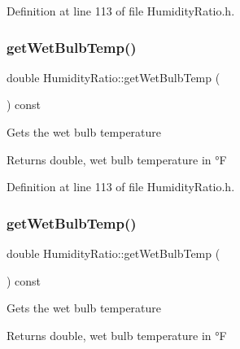 Definition at line 113 of file Humidity\+Ratio.\+h.

\mbox{\label{class_humidity_ratio_adbadf93878e4867ce283319859d04087}} 
\subsubsection{\texorpdfstring{get\+Wet\+Bulb\+Temp()}{getWetBulbTemp()}\hspace{0.1cm}{\footnotesize\ttfamily [2/3]}}
{\footnotesize\ttfamily double Humidity\+Ratio\+::get\+Wet\+Bulb\+Temp (\begin{DoxyParamCaption}{ }\end{DoxyParamCaption}) const\hspace{0.3cm}{\ttfamily [inline]}}

Gets the wet bulb temperature

\begin{DoxyReturn}{Returns}
double, wet bulb temperature in °F 
\end{DoxyReturn}


Definition at line 113 of file Humidity\+Ratio.\+h.

\mbox{\label{class_humidity_ratio_adbadf93878e4867ce283319859d04087}} 
\subsubsection{\texorpdfstring{get\+Wet\+Bulb\+Temp()}{getWetBulbTemp()}\hspace{0.1cm}{\footnotesize\ttfamily [3/3]}}
{\footnotesize\ttfamily double Humidity\+Ratio\+::get\+Wet\+Bulb\+Temp (\begin{DoxyParamCaption}{ }\end{DoxyParamCaption}) const\hspace{0.3cm}{\ttfamily [inline]}}

Gets the wet bulb temperature

\begin{DoxyReturn}{Returns}
double, wet bulb temperature in °F 
\end{DoxyReturn}


